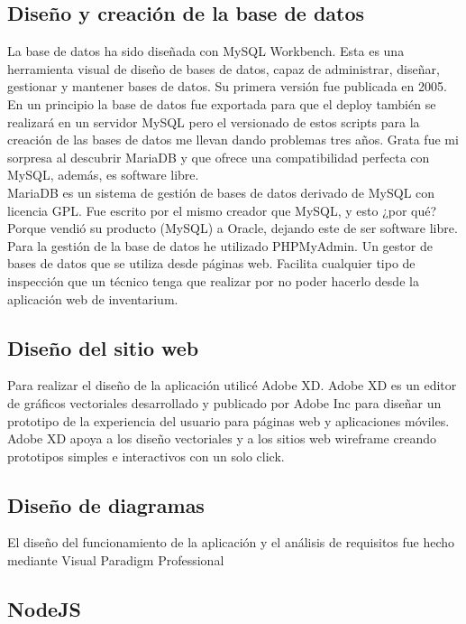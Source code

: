 \subsection{Diseño y creación de la base de datos}

La base de datos ha sido diseñada con MySQL Workbench. Esta es una herramienta visual de diseño de bases de datos, capaz de administrar, diseñar, gestionar y mantener bases de datos. Su primera versión fue publicada en 2005. 
\\En un principio la base de datos fue exportada para que el deploy también se realizará en un servidor MySQL pero el versionado de estos scripts para la creación de las bases de datos me llevan dando problemas tres años. Grata fue mi sorpresa al descubrir MariaDB y que ofrece una compatibilidad perfecta con MySQL, además, es software libre.
\\MariaDB es un sistema de gestión de bases de datos derivado de MySQL con licencia GPL. Fue escrito por el mismo creador que MySQL, y esto ¿por qué? Porque vendió su producto (MySQL) a Oracle, dejando este de ser software libre.
\\Para la gestión de la base de datos he utilizado PHPMyAdmin. Un gestor de bases de datos que se utiliza desde páginas web. Facilita cualquier tipo de inspección que un técnico tenga que realizar por no poder hacerlo desde la aplicación web de inventarium. 

\subsection{Diseño del sitio web}

Para realizar el diseño de la aplicación utilicé Adobe XD. Adobe XD es un editor de gráficos vectoriales desarrollado y publicado por Adobe Inc para diseñar un prototipo de la experiencia del usuario para páginas web y aplicaciones móviles.
\\Adobe XD apoya a los diseño vectoriales y a los sitios web wireframe creando prototipos simples e interactivos con un solo click.

\subsection{Diseño de diagramas}

El diseño del funcionamiento de la aplicación y el análisis de requisitos fue hecho mediante Visual Paradigm Professional

\subsection{NodeJS}

